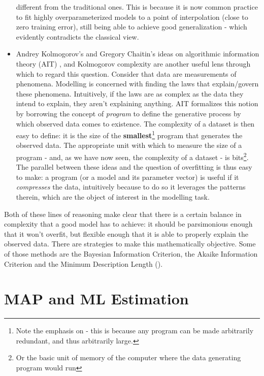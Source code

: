 \begin{itemize}
{        different from the traditional ones. This is because it is now common
        practice to fit highly overparameterized models to a point of interpolation
        (close to zero training error), still being able to achieve good generalization -
        which evidently contradicts the classical view.}
    \item Andrey Kolmogorov's and Gregory Chaitin's ideas on algorithmic information
        theory (AIT) \cite{chaitin-leibniz}, and Kolmogorov complexity  are another
        useful lens through which to regard this question. Consider that data are
        measurements of phenomena. Modelling is concerned with finding the
        laws that explain/govern these phenomena. Intuitively, if the laws are
        as complex as the data they intend to explain, they aren't explaining anything.
        AIT formalizes this notion by borrowing the concept of \emph{program} to
        define the generative process by which observed data comes to existence.
        The complexity of a dataset is then easy to define: it is the size of
        the \textbf{smallest}\footnote{Note the emphasis on  - this is
        because any program can be made arbitrarily redundant, and thus arbitrarily large.}
        program that generates the observed data. The appropriate unit with
        which to measure the size of a program - and, as we have now seen, the
        complexity of a dataset - is bits\footnote{Or the basic unit of memory
        of the computer where the data generating program would run}. The parallel
        between these ideas and the question of overfitting is thus easy to make:
        a program (or a model and its parameter vector)  is useful if it 
        \emph{compresses} the data, intuitively because to do so it leverages the
        patterns therein, which are the object of interest in the modelling task.
\end{itemize}

Both of these lines of reasoning make clear that there is a certain balance
in complexity that a good model has to achieve: it should be parsimonious enough
that it won't overfit, but flexible enough that it is able to properly explain
the observed data.  There are strategies to make this mathematically objective.
Some of those methods are the Bayesian Information Criterion, the Akaike
Information Criterion and the Minimum Description Length (\autocite{Lanterman_2001}).

\section{MAP and ML Estimation}
\label{section:map-mle}

